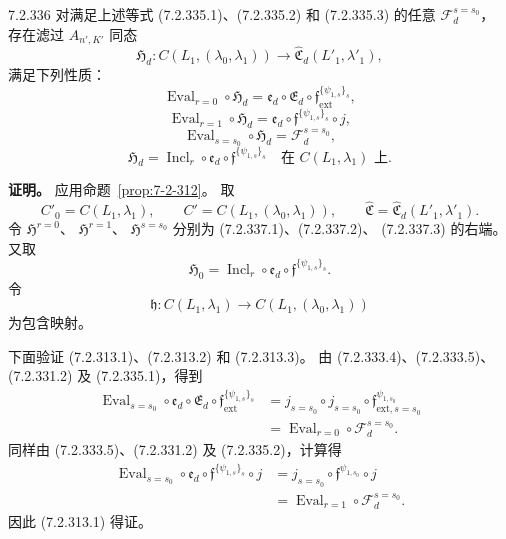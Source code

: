 
\begin{lemma}{7.2.336}\label{lem:7-2-336}
对满足上述等式
(7.2.335.1)、(7.2.335.2)
和 (7.2.335.3) 的任意
$\mathcal F_d^{s=s_0}$，
存在滤过 $A_{n',K'}$ 同态
\[
\mathfrak H_d\colon
C(L_1,(\lambda_0,\lambda_1))
\longrightarrow
\widehat{\mathfrak C}_d(L'_1,\lambda'_1),
\]
满足下列性质：
\begin{equation}
\operatorname{Eval}_{r=0}\circ\mathfrak H_d
=\mathfrak e_d\circ\mathfrak E_d
\circ\mathfrak f_{\mathrm{ext}}^{\{\psi_{1,s}\}_s},
\tag{7.2.337.1}\label{eq:7-2-337-1}
\end{equation}
\begin{equation}
\operatorname{Eval}_{r=1}\circ\mathfrak H_d
=\mathfrak e_d\circ
\mathfrak f^{\{\psi_{1,s}\}_s}\circ j,
\tag{7.2.337.2}\label{eq:7-2-337-2}
\end{equation}
\begin{equation}
\operatorname{Eval}_{s=s_0}\circ\mathfrak H_d
=\mathcal F_d^{s=s_0},
\tag{7.2.337.3}\label{eq:7-2-337-3}
\end{equation}
\begin{equation}
\mathfrak H_d
=\operatorname{Incl}_r\circ\mathfrak e_d
\circ\mathfrak f^{\{\psi_{1,s}\}_s}
\quad\text{在 }C(L_1,\lambda_1)\text{ 上}.
\tag{7.2.337.4}\label{eq:7-2-337-4}
\end{equation}
\end{lemma}

\noindent\textbf{证明。}
应用命题~\ref{prop:7-2-312}。
取
\[
C'_0=C(L_1,\lambda_1),\qquad
C'=C(L_1,(\lambda_0,\lambda_1)),\qquad
\widehat{\mathfrak C}
=\widehat{\mathfrak C}_d(L'_1,\lambda'_1).
\]
令
$\mathfrak H^{r=0}$、
$\mathfrak H^{r=1}$、
$\mathfrak H^{s=s_0}$
分别为
(7.2.337.1)、(7.2.337.2)、
(7.2.337.3)
的右端。
又取
\[
\mathfrak H_0
=\operatorname{Incl}_r\circ\mathfrak e_d
\circ\mathfrak f^{\{\psi_{1,s}\}_s}.
\]
令
\[
\mathfrak h\colon
C(L_1,\lambda_1)
\longrightarrow C(L_1,(\lambda_0,\lambda_1))
\]
为包含映射。

下面验证
(7.2.313.1)、(7.2.313.2)
和 (7.2.313.3)。
由 (7.2.333.4)、(7.2.333.5)、
(7.2.331.2) 及 (7.2.335.1)，得到
\[
\begin{aligned}
\operatorname{Eval}_{s=s_0}\circ\mathfrak e_d
\circ\mathfrak E_d
\circ\mathfrak f_{\mathrm{ext}}^{\{\psi_{1,s}\}_s}
&=j_{s=s_0}\circ j_{s=s_0}
\circ\mathfrak f_{\mathrm{ext},s=s_0}^{\psi_{1,s_0}}\\
&=\operatorname{Eval}_{r=0}
\circ\mathcal F_d^{s=s_0}.
\end{aligned}
\]
同样由 (7.2.333.5)、(7.2.331.2)
及 (7.2.335.2)，计算得
\[
\begin{aligned}
\operatorname{Eval}_{s=s_0}\circ\mathfrak e_d
\circ\mathfrak f^{\{\psi_{1,s}\}_s}\circ j
&=j_{s=s_0}\circ
\mathfrak f^{\psi_{1,s_0}}\circ j\\
&=\operatorname{Eval}_{r=1}
\circ\mathcal F_d^{s=s_0}.
\end{aligned}
\]
因此 (7.2.313.1) 得证。

